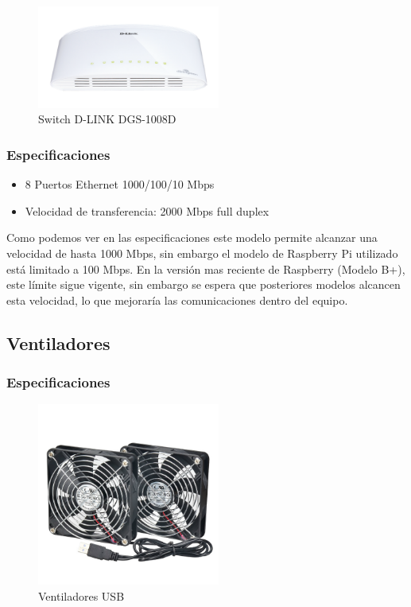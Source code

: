 \begin{figure}[H]
	\centering
  	\includegraphics[width=60mm]{pics/DGS_1008DSwitch8.png}
   	\caption[Switch D-LINK DGS-1008D]{Switch D-LINK DGS-1008D}
   \label{figure2.2}
\end{figure}

\subsubsection{Especificaciones}

\begin{itemize}
  \item 8 Puertos Ethernet 1000/100/10 Mbps
  \item Velocidad de transferencia: 2000 Mbps full duplex
\end{itemize}

Como podemos ver en las especificaciones este modelo permite alcanzar una velocidad de hasta 1000 Mbps, sin embargo el modelo de Raspberry Pi utilizado está limitado a 100 Mbps. En la versión mas reciente de Raspberry (Modelo B+), este límite sigue vigente, sin embargo se espera que posteriores modelos alcancen esta velocidad, lo que mejoraría las comunicaciones dentro del equipo. 



\subsection{Ventiladores}
\subsubsection{Especificaciones}

\begin{figure}[H]
	\centering
  	\includegraphics[width=60mm]{pics/fan120.png}
   	\caption[Ventiladores USB]{Ventiladores USB}
   \label{figure2.4}
\end{figure}

